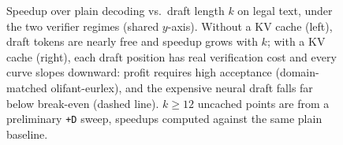 \begin{figure}[t]
\caption{Speedup over plain decoding vs.\ draft length $k$ on legal text, under
the two verifier regimes (shared $y$-axis). Without a KV cache (left), draft
tokens are nearly free and speedup grows with $k$; with a KV cache (right),
each draft position has real verification cost and every curve slopes downward:
profit requires high acceptance (domain-matched olifant-eurlex), and the
expensive neural draft falls far below break-even (dashed line).
$k \geq 12$ uncached points are from a preliminary \texttt{+D} sweep, speedups
computed against the same plain baseline.}
\label{fig:speedupk}
\end{figure}
